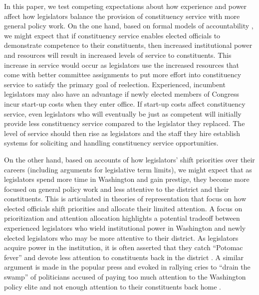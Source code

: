 \documentclass[12pt]{article}
\begin{document}
In this paper, we test competing expectations about how experience and power affect how legislators balance the provision of constituency service with more general policy work. On the one hand, based on formal models of accountability \citep{AshworthBuenodeMesquita2006}, we might expect that if constituency service enables elected officials to demonstrate competence to their constituents, then increased institutional power and resources will result in increased levels of service to constituents. This increase in service would occur as legislators use the increased resources that come with better committee assignments to put more effort into constituency service to satisfy the primary goal of reelection. Experienced, incumbent legislators may also have an advantage if newly elected members of Congress incur start-up costs when they enter office. If start-up costs affect constituency service, even legislators who will eventually be just as competent will initially provide less constituency service compared to the legislator they replaced. The level of service should then rise as legislators and the staff they hire establish systems for soliciting and handling constituency service opportunities.


On the other hand, based on accounts of how legislators' shift priorities over their careers (including arguments for legislative term limits), we might expect that as legislators spend more time in Washington and gain prestige, they become more focused on general policy work and less attentive to the district and their constituents. This is articulated in theories of representation that focus on how elected officials shift priorities and allocate their limited attention. A focus on prioritization and attention allocation highlights a potential tradeoff between experienced legislators who wield institutional power in Washington and newly elected legislators who may be more attentive to their district. As legislators acquire power in the institution, it is often asserted that they catch ``Potomac fever'' and devote less attention to constituents back in the district \citep{Fenno1978}. A similar argument is made in the popular press \citep{Edwards2005} and evoked in rallying cries to ``drain the swamp'' of politicians accused of paying too much attention to the Washington policy elite and not enough attention to their constituents back home \citep{Rosenblatt2016}. 
\end{document}

